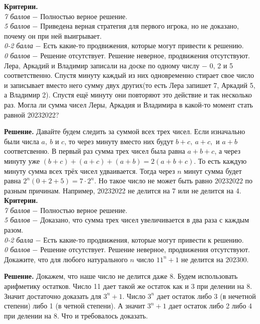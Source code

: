 \textbf{Критерии.} \\
\textit{7 баллов} $-$ Полностью верное решение. \\
\textit{5 баллов} $-$ Приведена верная стратегия для первого игрока, но не доказано, почему он при ней выигрывает. \\ 
\textit{0-2 балла} $-$ Есть какие-то продвижения, которые могут привести к решению. \\ 
\textit{0 баллов} $-$ Решение отсутствует. Решение неверное, продвижения отсутствуют. \\ 

 Лера, Аркадий и Владимир записали на доске по одному числу $-$ 0, 2 и 5 соответственно. Спустя минуту каждый из них одновременно стирает свое число и записывает вместо него сумму двух других(то есть Лера запишет 7, Аркадий 5, а Владимир 2). Спустя ещё минуту они повторяют это действие и так несколько раз. Могла ли сумма чисел Леры, Аркадия и Владимира в какой-то момент стать равной 20232022? \par

\textbf{Решение.} Давайте будем следить за суммой всех трех чисел. Если изначально были числа $a, \ b$ и $c$, то через минуту вместо них будут $b+c, \ a+c,$ и $a+b$ соответсвенно. В первый раз сумма трех чисел была равна $a+b+c$, а через минуту уже $(b+c) + (a+c) + (a+b) = 2(a+b+c)$. То есть каждую минуту сумма всех трёх чисел удваивается. Тогда через $n$ минут сумма будет равна $2^n(0+2+5) = 7\cdot2^n$. Но такое число не может быть равно $20232022$ по разным причинам. Например, 20232022 не делится на 7 или не делится на 4.\\

\textbf{Критерии.} \\
\textit{7 баллов} $-$ Полностью верное решение. \\
\textit{5 баллов} $-$ Доказано, что сумма трех чисел увеличивается в два раза с каждым разом. \\
\textit{0-2 балла} $-$ Есть какие-то продвижения, которые могут привести к решению. \\ 
\textit{0 баллов} $-$ Решение отсутствует. Решение неверное, продвижения отсутствуют. \\ 

 Докажите, что для любого натурального $n$ число $11^n + 1$ не делится на $202300$.\par

\textbf{Решение.} Докажем, что наше число не делится даже $8$. Будем использовать арифметику остатков. Число 11 дает такой же остаток как и 3 при делении на 8. Значит достаточно доказать для $3^n + 1$. Число $3^n$ дает остаток либо 3 (в нечетной степени) либо 1 (в четной степени). А значит $3^n + 1$ дает остаток либо 2 либо 4 при делении на 8. Что и требовалось доказать. \\ 

